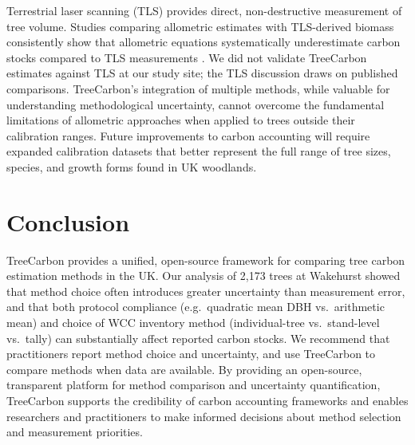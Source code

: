 \documentclass[12pt,a4paper]{article}
\begin{document}
Terrestrial laser scanning (TLS) provides direct, non-destructive measurement of tree volume. Studies comparing allometric estimates with TLS-derived biomass consistently show that allometric equations systematically underestimate carbon stocks compared to TLS measurements \citep{Calders2022, Demol2022}. We did not validate TreeCarbon estimates against TLS at our study site; the TLS discussion draws on published comparisons. TreeCarbon's integration of multiple methods, while valuable for understanding methodological uncertainty, cannot overcome the fundamental limitations of allometric approaches when applied to trees outside their calibration ranges. Future improvements to carbon accounting will require expanded calibration datasets that better represent the full range of tree sizes, species, and growth forms found in UK woodlands.

\section{Conclusion}

TreeCarbon provides a unified, open-source framework for comparing tree carbon estimation methods in the UK. Our analysis of 2,173 trees at Wakehurst showed that method choice often introduces greater uncertainty than measurement error, and that both protocol compliance (e.g.\ quadratic mean DBH vs.\ arithmetic mean) and choice of WCC inventory method (individual-tree vs.\ stand-level vs.\ tally) can substantially affect reported carbon stocks. We recommend that practitioners report method choice and uncertainty, and use TreeCarbon to compare methods when data are available. By providing an open-source, transparent platform for method comparison and uncertainty quantification, TreeCarbon supports the credibility of carbon accounting frameworks and enables researchers and practitioners to make informed decisions about method selection and measurement priorities.

% 
% 
\end{document}
